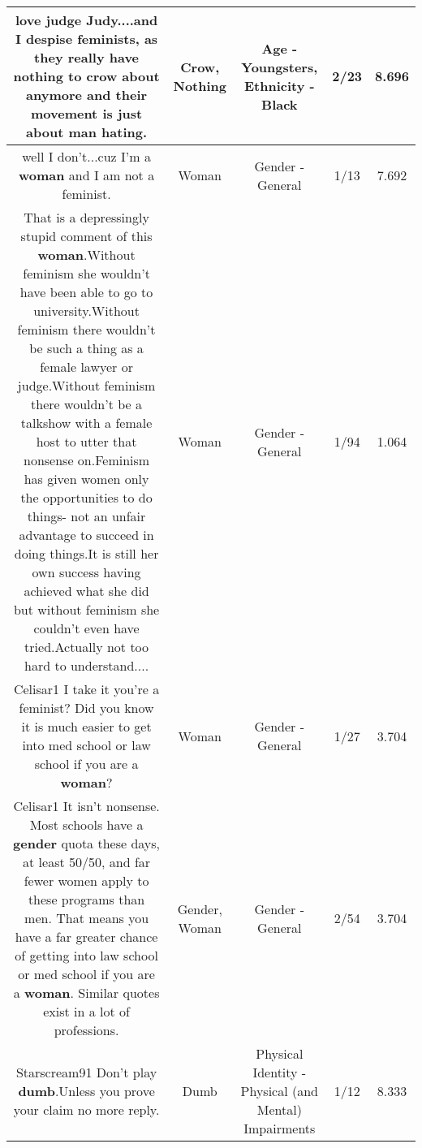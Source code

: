 \documentclass[11pt]{article}
\newlength\mylength
\begin{document}
\begin{center}
\begin{longtable}{|C{.65\mylength}|C{.30\mylength}|C{.12\mylength}|C{.12\mylength}|C{.12\mylength}|}
  \small love judge Judy....and I despise feminists, as they really have \textbf{nothing} to \textbf{crow} about anymore and their movement is just about man hating.\normalsize   & Crow, Nothing & Age - Youngsters, Ethnicity - Black & 2/23 & 8.696 \\  \hline
  \small well I don't...cuz I'm a \textbf{woman} and I am not a feminist.\normalsize   & Woman & Gender - General & 1/13 & 7.692 \\  \hline
  \small That is a depressingly stupid comment of this \textbf{woman}.Without feminism she wouldn't have been able to go to university.Without feminism there wouldn't be such a thing as a female lawyer or judge.Without feminism there wouldn't be a talkshow with a female host to utter that nonsense on.Feminism has given women only the opportunities to do things- not an unfair advantage to succeed in doing things.It is still her own success having achieved what she did but without feminism she couldn't even have tried.Actually not too hard to understand....\normalsize   & Woman & Gender - General & 1/94 & 1.064 \\  \hline
  \small Celisar1 I take it you're a feminist? Did you know it is much easier to get into med school or law school if you are a \textbf{woman}?\normalsize   & Woman & Gender - General & 1/27 & 3.704 \\  \hline
  \small Celisar1 It isn't nonsense. Most schools have a \textbf{gender} quota these days, at least 50/50, and far fewer women apply to these programs than men. That means you have a far greater chance of getting into law school or med school if you are a \textbf{woman}. Similar quotes exist in a lot of professions.\normalsize   & Gender, Woman & Gender - General & 2/54 & 3.704 \\  \hline
  \small Starscream91 Don't play \textbf{dumb}.Unless you prove your claim no more reply.\normalsize   & Dumb & Physical Identity - Physical (and Mental) Impairments & 1/12 & 8.333 \\  \hline

\end{longtable}
\end{center}
\end{document}
